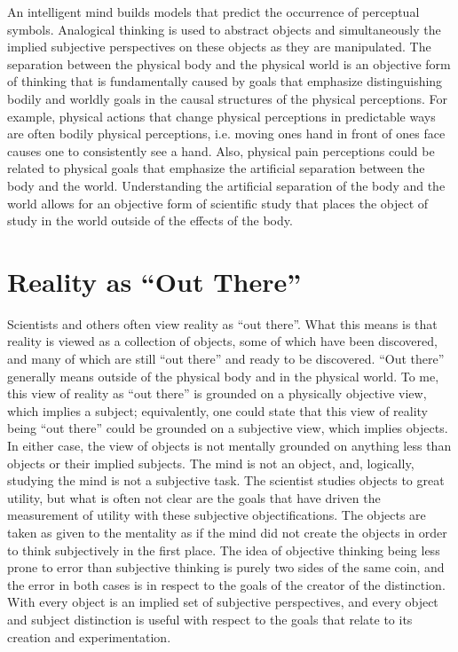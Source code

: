 An intelligent mind builds models that predict the occurrence of
perceptual symbols.  Analogical thinking is used to abstract objects
and simultaneously the implied subjective perspectives on these
objects as they are manipulated.  The separation between the physical
body and the physical world is an objective form of thinking that is
fundamentally caused by goals that emphasize distinguishing bodily and
worldly goals in the causal structures of the physical perceptions.
For example, physical actions that change physical perceptions in
predictable ways are often bodily physical perceptions, i.e. moving
ones hand in front of ones face causes one to consistently see a hand.
Also, physical pain perceptions could be related to physical goals
that emphasize the artificial separation between the body and the
world.  Understanding the artificial separation of the body and the
world allows for an objective form of scientific study that places the
object of study in the world outside of the effects of the body.

\section{Reality as ``Out There''}

Scientists and others often view reality as ``out there''.  What this
means is that reality is viewed as a collection of objects, some of
which have been discovered, and many of which are still ``out there''
and ready to be discovered.  ``Out there'' generally means outside of
the physical body and in the physical world.  To me, this view of
reality as ``out there'' is grounded on a physically objective view,
which implies a subject; equivalently, one could state that this view
of reality being ``out there'' could be grounded on a subjective view,
which implies objects.  In either case, the view of objects is not
mentally grounded on anything less than objects or their implied
subjects.  The mind is not an object, and, logically, studying the
mind is not a subjective task.  The scientist studies objects to great
utility, but what is often not clear are the goals that have driven
the measurement of utility with these subjective objectifications.
The objects are taken as given to the mentality as if the mind did not
create the objects in order to think subjectively in the first place.
The idea of objective thinking being less prone to error than
subjective thinking is purely two sides of the same coin, and the
error in both cases is in respect to the goals of the creator of the
distinction.  With every object is an implied set of subjective
perspectives, and every object and subject distinction is useful with
respect to the goals that relate to its creation and experimentation.

